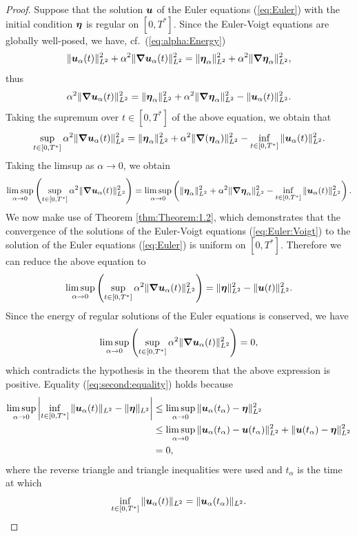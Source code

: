 \begin{proof}
Suppose that the solution $\boldsymbol u$ of the Euler equations (\ref{eq:Euler}) with the initial condition ${\boldsymbol \eta}$ is regular on $[0,T^*]$. Since the Euler-Voigt equations are globally well-posed, we have, cf.~(\ref{eq:alpha:Energy})
\begin{equation}
\|\boldsymbol u_\alpha(t)\|_{L^2}^2 + \alpha^2\|{\boldsymbol \nabla}\boldsymbol u_\alpha(t)\|_{L^2}^2  = \|{\boldsymbol \eta_\alpha}\|_{L^2}^2+\alpha^2\|{\boldsymbol \nabla}{\boldsymbol \eta_\alpha}\|_{L^2}^2,
\end{equation}
thus
\begin{equation}
\alpha^2\|{\boldsymbol \nabla}\boldsymbol u_\alpha(t)\|_{L^2}^2  = \|{\boldsymbol \eta_\alpha}\|_{L^2}^2+\alpha^2\|{\boldsymbol \nabla}{\boldsymbol \eta_\alpha}\|_{L^2}^2 - \|\boldsymbol u_\alpha(t)\|_{L^2}^2.
\end{equation}
Taking the supremum over $t\in[0,T^*]$ of the above equation, we obtain that
\begin{equation}
\sup_{t\in[0,T^*]}\alpha^2\|{\boldsymbol \nabla}\boldsymbol u_\alpha(t)\|_{L^2}^2  = \|{\boldsymbol \eta_\alpha}\|_{L^2}^2+\alpha^2\|{\boldsymbol \nabla}({\boldsymbol \eta_\alpha})\|_{L^2}^2 - \inf_{t\in[0,T^*]} \|\boldsymbol u_\alpha(t)\|_{L^2}^2.
\end{equation}
Taking the limsup as $\alpha\rightarrow 0$, we obtain 
\begin{equation}
\limsup_{\alpha\rightarrow 0}\left(\sup_{t\in[0,T^*]}\alpha^2\|{\boldsymbol \nabla}\boldsymbol u_\alpha(t)\|_{L^2}^2\right)  = \limsup_{\alpha\rightarrow 0}\left(\|{\boldsymbol \eta_\alpha}\|_{L^2}^2+\alpha^2\|{\boldsymbol \nabla} {\boldsymbol \eta_\alpha}\|_{L^2}^2 - \inf_{t\in[0,T^*]} \|\boldsymbol u_\alpha(t)\|_{L^2}^2\right).
\end{equation}
We now make use of Theorem \ref{thm:Theorem:1.2}, which demonstrates that the convergence of the solutions of the Euler-Voigt equations (\ref{eq:Euler:Voigt}) to the solution of the Euler equations (\ref{eq:Euler}) is uniform on $[0,T^*]$. Therefore we can reduce the above equation to
\begin{equation}\label{eq:second:equality}
\limsup_{\alpha\rightarrow 0}\left(\sup_{t\in[0,T^*]}\alpha^2\|{\boldsymbol \nabla}\boldsymbol u_\alpha(t)\|_{L^2}^2\right)  = \|{\boldsymbol \eta}\|_{L^2}^2 - \|\boldsymbol u(t)\|_{L^2}^2.
\end{equation}
Since the energy of regular solutions of the Euler equations is conserved, we have
\begin{equation}
\limsup_{\alpha\rightarrow 0}\left(\sup_{t\in[0,T^*]}\alpha^2\|{\boldsymbol \nabla}\boldsymbol u_\alpha(t)\|_{L^2}^2\right)  = 0,
\end{equation}
which contradicts the hypothesis in the theorem that the above expression is positive. Equality (\ref{eq:second:equality}) holds because\vspace{-0.3cm}
\begin{subequations}
\begin{align*}
\limsup_{\alpha\rightarrow 0}\left| \inf_{t\in[0,T^*]} \|\boldsymbol u_\alpha(t)\|_{L^2} - \|{\boldsymbol \eta}\|_{L^2} \right| &\leq \limsup_{\alpha\rightarrow 0}\|\boldsymbol u_\alpha(t_\alpha) - {\boldsymbol \eta}\|_{L^2}^2 \\
&\leq \limsup_{\alpha\rightarrow 0}\|\boldsymbol u_\alpha(t_\alpha) - \boldsymbol u(t_\alpha)\|_{L^2}^2 + \|\boldsymbol u(t_\alpha) - {\boldsymbol \eta}\|_{L^2}^2 \\
&= 0,
\end{align*}
\end{subequations}
where the reverse triangle and triangle inequalities were used and $t_\alpha$ is the time at which
\begin{equation}
\inf_{t\in[0,T^*]} \|\boldsymbol u_\alpha(t)\|_{L^2} = \|\boldsymbol u_\alpha(t_\alpha)\|_{L^2}.
\end{equation}


\end{proof}
